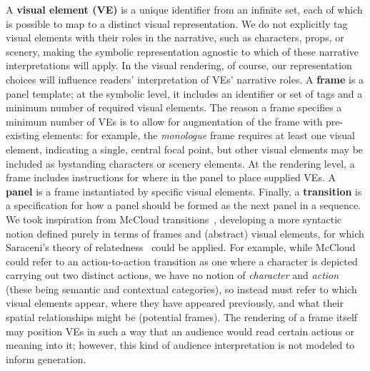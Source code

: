 A {\bf visual element (VE)} is a unique identifier from an infinite set,
each of which is possible to map to a distinct visual representation.
We do not explicitly tag visual elements with their roles in the narrative,
such as characters, props, or scenery, making the symbolic representation
agnostic to which of these narrative interpretations will apply. In the
visual rendering, of course, our representation choices will influence
readers' interpretation of VEs' narrative roles.
%
A {\bf frame} is a panel template; at the symbolic level, it
includes an identifier or set of tags and a minimum number of required
visual elements. The reason a frame specifies a {minimum} number of VEs
is to allow for augmentation of the frame with pre-existing elements: for
example, the {\em monologue} frame requires at least one visual element,
indicating a single, central focal point, but other visual elements may be
included as bystanding characters or scenery elements.
At the rendering level, a frame includes instructions for where in the
panel to place supplied VEs.
A {\bf panel} is a frame instantiated by specific visual elements.
%
%
Finally, a {\bf transition} is a specification for how a panel should be
formed as the next panel in a sequence.
%
We took inspiration from McCloud
transitions~\cite{mcCloud1993understanding}, developing a more
syntactic notion  defined purely in terms of frames and (abstract) visual
elements, for which Saraceni's theory of
relatedness~\cite{saraceni2016relatedness} could be applied. For example,
while McCloud could refer to an action-to-action transition as one where a
character is depicted carrying out two distinct actions, we have no notion
of {\em character} and {\em action} (these being semantic and contextual
categories), so instead must refer to which visual elements appear, where
they have appeared previously, and what their spatial relationships might
be (potential frames). The rendering of a frame itself may position VEs in
such a way that an audience would read certain actions or meaning into it;
however, this kind of audience interpretation is not modeled to inform
generation.

